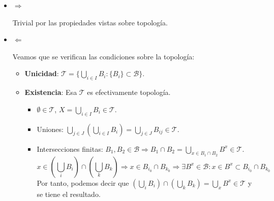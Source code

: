 \begin{demo}
\begin{itemize}
\item $\Rightarrow$

Trivial por las propiedades vistas sobre topología.

\item $\Leftarrow$

Veamos que se verifican las condiciones sobre la topología:
\begin{itemize}
    \item \textbf{Unicidad}: $\mathcal{T} = \{\bigcup_{i \in  I} B_i: \{B_i\} \subset \mathcal{B}\}$.
    \item \textbf{Existencia}: Esa $\mathcal{T}$ es efectivamente topología. 
        \begin{itemize}
            \item $\emptyset \in \mathcal{T}$, $X = \bigcup_{i\in I} B_i \in \mathcal{T}$.
            \item Uniones: $\bigcup_{j\in J} \left(\bigcup_{i\in I} B_{i}\right) = \bigcup_{j\in J} B_{ij} \in \mathcal{T}$. 
            \item Intersecciones finitas: $B_1, B_2 \in \mathcal{B} \Rightarrow B_1 \cap B_2 = \bigcup_{x \in B_1 \cap B_2} B^x \in \mathcal{T}$.
            $$
            x \in \left( \bigcup_{i} B_i \right) \cap \left( \bigcup_{k} B_k \right) \Rightarrow x \in B_{i_0} \cap B_{k_0} \Rightarrow \exists B^x \in \mathcal{B} : x\in B^x \subset B_{i_0} \cap B_{k_0}
            $$
            Por tanto, podemos decir que $\left( \bigcup_{i} B_i \right) \cap \left( \bigcup_{k} B_k \right) = \bigcup_{x} B^x \in \mathcal{T}
            $ y se tiene el resultado.
        \end{itemize}
\end{itemize}
\end{itemize}
\end{demo}

